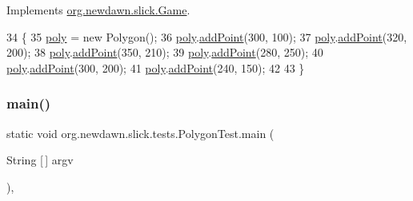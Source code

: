 Implements \mbox{\hyperlink{interfaceorg_1_1newdawn_1_1slick_1_1_game_ad2dd6affab08bb8fdb5fab0815957b7a}{org.\+newdawn.\+slick.\+Game}}.


\begin{DoxyCode}
34                                                                     \{
35         \mbox{\hyperlink{classorg_1_1newdawn_1_1slick_1_1tests_1_1_polygon_test_a9208c4dd8be9ef4468e17c2d6f0fdff0}{poly}} = \textcolor{keyword}{new} Polygon();
36         \mbox{\hyperlink{classorg_1_1newdawn_1_1slick_1_1tests_1_1_polygon_test_a9208c4dd8be9ef4468e17c2d6f0fdff0}{poly}}.\mbox{\hyperlink{classorg_1_1newdawn_1_1slick_1_1geom_1_1_polygon_a62d22ea48361fe38f8868f1f126a7b7a}{addPoint}}(300, 100);
37         \mbox{\hyperlink{classorg_1_1newdawn_1_1slick_1_1tests_1_1_polygon_test_a9208c4dd8be9ef4468e17c2d6f0fdff0}{poly}}.\mbox{\hyperlink{classorg_1_1newdawn_1_1slick_1_1geom_1_1_polygon_a62d22ea48361fe38f8868f1f126a7b7a}{addPoint}}(320, 200);
38         \mbox{\hyperlink{classorg_1_1newdawn_1_1slick_1_1tests_1_1_polygon_test_a9208c4dd8be9ef4468e17c2d6f0fdff0}{poly}}.\mbox{\hyperlink{classorg_1_1newdawn_1_1slick_1_1geom_1_1_polygon_a62d22ea48361fe38f8868f1f126a7b7a}{addPoint}}(350, 210);
39         \mbox{\hyperlink{classorg_1_1newdawn_1_1slick_1_1tests_1_1_polygon_test_a9208c4dd8be9ef4468e17c2d6f0fdff0}{poly}}.\mbox{\hyperlink{classorg_1_1newdawn_1_1slick_1_1geom_1_1_polygon_a62d22ea48361fe38f8868f1f126a7b7a}{addPoint}}(280, 250);
40         \mbox{\hyperlink{classorg_1_1newdawn_1_1slick_1_1tests_1_1_polygon_test_a9208c4dd8be9ef4468e17c2d6f0fdff0}{poly}}.\mbox{\hyperlink{classorg_1_1newdawn_1_1slick_1_1geom_1_1_polygon_a62d22ea48361fe38f8868f1f126a7b7a}{addPoint}}(300, 200);
41         \mbox{\hyperlink{classorg_1_1newdawn_1_1slick_1_1tests_1_1_polygon_test_a9208c4dd8be9ef4468e17c2d6f0fdff0}{poly}}.\mbox{\hyperlink{classorg_1_1newdawn_1_1slick_1_1geom_1_1_polygon_a62d22ea48361fe38f8868f1f126a7b7a}{addPoint}}(240, 150);
42         
43     \}
\end{DoxyCode}
\mbox{\label{classorg_1_1newdawn_1_1slick_1_1tests_1_1_polygon_test_a3d5a51be6c2602b4ee1e09024c7d90b5}} 
\subsubsection{\texorpdfstring{main()}{main()}}
{\footnotesize\ttfamily static void org.\+newdawn.\+slick.\+tests.\+Polygon\+Test.\+main (\begin{DoxyParamCaption}\item[{String \mbox{[}$\,$\mbox{]}}]{argv }\end{DoxyParamCaption})\hspace{0.3cm}{\ttfamily [inline]}, {\ttfamily [static]}}

